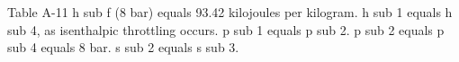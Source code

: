 Table A-11  
h sub f (8 bar) equals 93.42 kilojoules per kilogram.  
h sub 1 equals h sub 4, as isenthalpic throttling occurs.  
p sub 1 equals p sub 2.  
p sub 2 equals p sub 4 equals 8 bar.  
s sub 2 equals s sub 3.